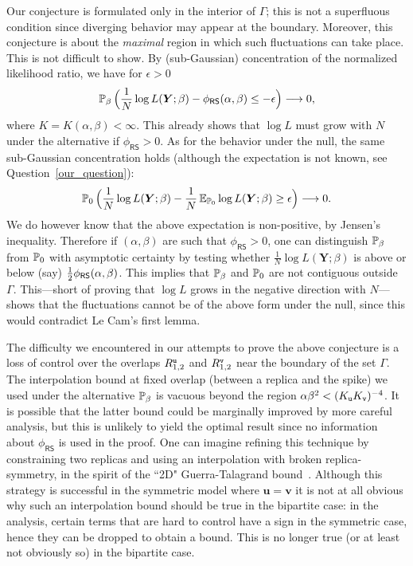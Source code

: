 \documentclass[final,12pt]{colt2018} %
\newcommand{\RS}{\mathsf{RS}} %
\newcommand{\utt}{\textup{\texttt{u}}}
\newcommand{\vtt}{\textup{\texttt{v}}}
\renewcommand{\u}{\bm{u}}
\renewcommand{\v}{\bm{v}}
\newcommand{\Y}{\bm{Y}}
\begin{document}
Our conjecture is formulated only in the interior of $\Gamma$; this is not a superfluous condition since diverging behavior may appear at the boundary. Moreover, this conjecture is about the \emph{maximal} region in which such fluctuations can take place. This is not difficult to show. By (sub-Gaussian) concentration of the normalized likelihood ratio, we have for $\epsilon >0$
\[\P_{\beta}\Big(\frac{1}{N}\log L(\Y;\beta) - \phi_{\RS}(\alpha,\beta) \le -\epsilon\Big)  \longrightarrow 0,\]
where $K = K(\alpha,\beta)<\infty$. This already shows that $\log L$ must grow with $N$ under the alternative if $\phi_{\RS} >0$. As for the behavior under the null,  
the same sub-Gaussian concentration holds (although the expectation is not known, see Question~\ref{our_question}):
\[\P_{0}\Big(\frac{1}{N}\log L(\Y;\beta) - \frac{1}{N}\E_{\P_{0}}\log L(\Y;\beta) \ge \epsilon\Big) \longrightarrow 0.\]
We do however know that the above expectation is non-positive, by Jensen's inequality. Therefore if $(\alpha,\beta)$ are such that $\phi_{\RS} >0$, one can distinguish $\P_{\beta}$ from $\P_{0}$ with asymptotic certainty by testing whether $\frac{1}{N}\log L(\Y;\beta)$ is above or below (say) $\half\phi_{\RS}(\alpha,\beta)$. This implies that $\P_{\beta}$ and $\P_{0}$ are not contiguous outside $\Gamma$. This---short of proving that $\log L$ grows in the negative direction with $N$---shows that the fluctuations cannot be of the above form under the null, since this would contradict Le Cam's first lemma.   


The difficulty we encountered in our attempts to prove the above conjecture is a loss of control over the overlaps $R_{1,2}^{\utt}$ and $R_{1,2}^{\vtt}$ near the boundary of the set $\Gamma$. The interpolation bound at fixed overlap (between a replica and the spike) we used under the alternative $\P_{\beta}$ is vacuous beyond the region $\alpha\beta^2 <(K_{\utt}K_{\vtt})^{-4}$. It is possible that the latter bound could be marginally improved by more careful analysis, but this is unlikely to yield the optimal result since no information about $\phi_{\RS}$ is used in the proof. One can imagine refining this technique by constraining two replicas and using an interpolation with broken replica-symmetry, in the spirit of the ``2D" Guerra-Talagrand bound~\citep{guerra2003broken,talagrand2011mean2}. Although this strategy is successful in the symmetric model where $\u = \v$ it is not at all obvious why such an interpolation bound should be true in the bipartite case: in the analysis, certain terms that are hard to control have a sign in the symmetric case, hence they can be dropped to obtain a bound. This is no longer true (or at least not obviously so) in the bipartite case.          
 
\end{document}
